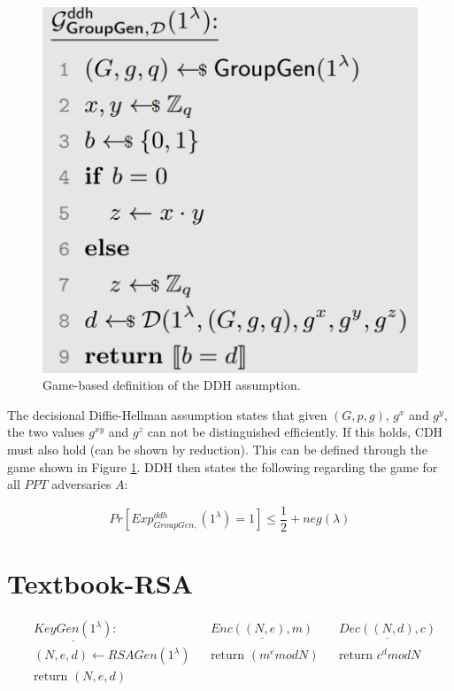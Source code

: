 \begin{figure}
    \center
    \includegraphics[width=\linewidth]{gfx/DDH_assumption.png}
    \caption{Game-based definition of the DDH assumption.}
    \label{fig:DDH_assumption}
\end{figure}

The decisional Diffie-Hellman assumption states that given $(G,p,g)$, $g^x$ and $g^y$, the two values $g^{xy}$ and $g^z$ can not be distinguished efficiently.
If this holds, CDH must also hold (can be shown by reduction).
This can be defined through the game shown in Figure \ref{fig:DDH_assumption}.
DDH then states the following regarding the game for all $PPT$ adversaries $A$:

$$
    Pr[Exp_{GroupGen,}^{ddh}(1^\lambda) = 1] \leq \frac{1}{2} + neg(\lambda)
$$


\section{Textbook-RSA}\label{sec:textbook_rsa}


\begin{align*}
     & \underline{KeyGen(1^\lambda)}:         &  & \underline{Enc((N,e), m)} &  & \underline{Dec((N,d), c)} \\
     & (N, e, d) \leftarrow RSAGen(1^\lambda) &  & \text{return }(m^e mod N) &  & \text{return } c^d mod N  \\
     & \text{return } (N, e, d)               &  &                           &  &                           \\
\end{align*}

